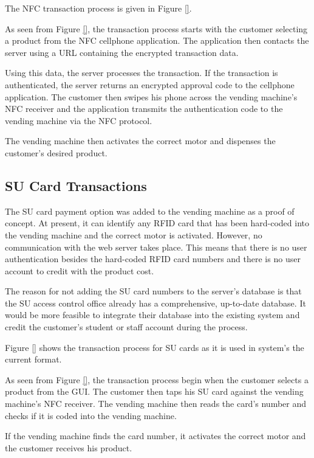
The NFC transaction process is given in Figure \ref{}.

As seen from Figure \ref{}, the transaction process starts with the customer
selecting a product from the NFC cellphone application. The application then contacts
the server using a URL containing the encrypted transaction data. 

Using this data, the server processes the transaction. If the transaction is
authenticated, the server returns an encrypted approval code to the cellphone
application. The customer then swipes his phone across the vending machine's NFC
receiver and the application transmits the authentication code to the vending machine
via the NFC protocol. 

The vending machine then activates the correct motor and dispenses the
customer's desired product.

\subsection{SU Card Transactions}
\label{sec:su-card}


The SU card payment option was added to the vending machine as a proof of
concept. At present, it can identify any RFID card that has been hard-coded
into the vending machine and the correct motor is activated. However, no
communication with the web server takes place. This means that there is no user
authentication besides the hard-coded RFID card numbers and there is no user
account to credit with the product cost.

The reason for not adding the SU card numbers to the server's database is that
the SU access control office already has a comprehensive, up-to-date database. It
would be more feasible to integrate their database into the existing system and
credit the customer's student or staff account during the process. 

Figure \ref{} shows the transaction process for SU cards as it is used in
system's the current format. 

As seen from Figure \ref{}, the transaction process begin when the customer
selects a product from the GUI. The customer then taps his SU card against the
vending machine's NFC receiver. The vending machine then reads the card's number
and checks if it is coded into the vending machine. 

If the vending machine finds the card number, it activates the correct motor and
the customer receives his product.
